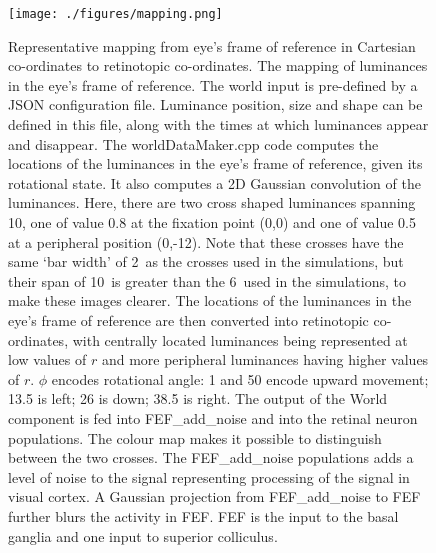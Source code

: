 \documentclass{frontiersSCNS}
\begin{document}
\begin{figure}[!ht]
\begin{center}
\texttt{[image: ./figures/mapping.png]}
\end{center}
\caption{ Representative mapping from eye's frame of reference in Cartesian
co-ordinates to retinotopic co-ordinates.  The mapping of
luminances in the eye's frame of reference. The world input is
pre-defined by a JSON configuration file. Luminance position, size and
shape can be defined in this file, along with the times at which
luminances appear and disappear. The worldDataMaker.cpp code computes
the locations of the luminances in the eye's frame of reference, given
its rotational state. It also computes a 2D Gaussian convolution of
the luminances. Here, there are two cross shaped luminances spanning
10\dg, one of value 0.8 at the fixation point (0,0) and one of value
0.5 at a peripheral position (0,-12\dg). Note that these crosses have
the same `bar width' of 2\dg~as the crosses used in the simulations,
but their span of 10\dg~is greater than the 6\dg~used in the
simulations, to make these images clearer.  The locations of the
luminances in the eye's frame of reference are then converted into
retinotopic co-ordinates, with centrally located luminances being
represented at low values of $r$ and more peripheral luminances having
higher values of $r$. $\phi$ encodes rotational angle: 1 and 50 encode
upward movement; 13.5 is left; 26 is down; 38.5 is right. The output of
the World component is fed into FEF\_add\_noise and into the retinal
neuron populations. The colour map makes it possible to distinguish
between the two crosses.  The FEF\_add\_noise populations adds a
level of noise to the signal representing processing of the signal in
visual cortex.  A Gaussian projection from FEF\_add\_noise to FEF
further blurs the activity in FEF. FEF is the input to the basal
ganglia and one input to superior colliculus.}
\label{fig:mapping}
\end{figure}
\end{document}
